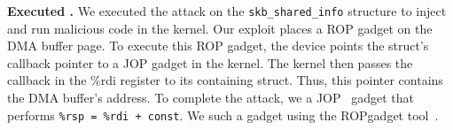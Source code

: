 \smallskip
\noindent\textbf{Executed \DIFdelbegin {}\DIFdelend \DIFaddbegin {}\DIFaddend .}
We executed the \textit{\DIFdelbegin {}\DIFdelend \DIFaddbegin {}\DIFaddend } attack on the \texttt{skb\_shared\_info} structure to inject and run malicious code in the kernel.
Our exploit places a ROP gadget on the DMA buffer page. To execute this ROP gadget, the device points the struct's callback pointer to a JOP gadget in the kernel. The kernel then passes the callback in the \%rdi register to its containing struct. Thus, this pointer contains the DMA buffer's address. 
To complete the attack, we \DIFdelbegin {}\DIFdelend \DIFaddbegin {}\DIFaddend a JOP~\cite{BJFL11} gadget that performs \texttt{\%rsp = \%rdi + const}. We \DIFdelbegin {}\DIFdelend \DIFaddbegin {}\DIFaddend such a gadget using the ROPgadget tool~\cite{ROPgadget}.

